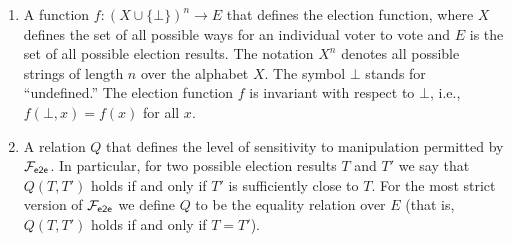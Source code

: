 \begin{enumerate}
\item A function $f: (X\cup \{\bot\})^n\rightarrow E$ that defines the
  election function, where $X$ defines the set of all possible ways
  for an individual voter to vote and $E$ is the set of all possible
  election results. The notation $X^n$ denotes all possible strings of
  length $n$ over the alphabet $X$. The symbol $\bot$ stands for
  ``undefined.''  The election function $f$ is invariant with respect
  to $\bot$, i.e., $f(\bot, x) = f(x)$ for all $x$.  
\item A relation $Q$ that defines the level of sensitivity to
  manipulation permitted by $\mathcal{F}_{\mathsf{e2e}}$. In particular, for two possible
  election results $T$ and $T'$ we say that $Q(T,T')$ holds if and
  only if $T'$ is sufficiently close to $T$. For the most strict
  version of $\mathcal{F}_{\mathsf{e2e}}$ we define $Q$ to be the equality relation over
  $E$ (that is, $Q(T,T')$ holds if and only if $T=T'$). 
\end{enumerate}

